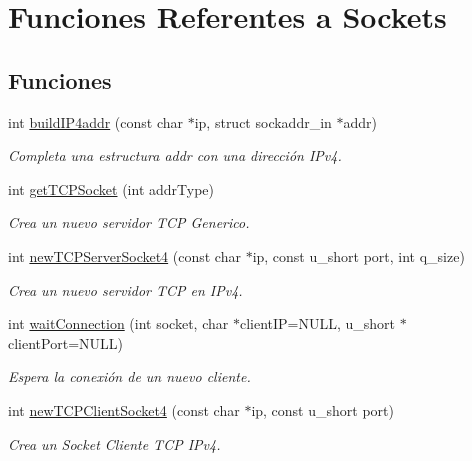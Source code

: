 \hypertarget{group__sockets}{
\section{Funciones Referentes a Sockets}
\label{group__sockets}
}
\subsection*{Funciones}
\begin{DoxyCompactItemize}
\item 
int \hyperlink{group__sockets_gadd88367e2f2c1ed8f81e910250a06180}{buildIP4addr} (const char $\ast$ip, struct sockaddr\_\-in $\ast$addr)
\begin{DoxyCompactList}\small\item\em Completa una estructura addr con una dirección IPv4. \end{DoxyCompactList}\item 
int \hyperlink{group__sockets_ga88bd320eafca5b9f4c54c4b5f3a17925}{getTCPSocket} (int addrType)
\begin{DoxyCompactList}\small\item\em Crea un nuevo servidor TCP Generico. \end{DoxyCompactList}\item 
int \hyperlink{group__sockets_ga944d699e112e8607aaa4a070d86d6e65}{newTCPServerSocket4} (const char $\ast$ip, const u\_\-short port, int q\_\-size)
\begin{DoxyCompactList}\small\item\em Crea un nuevo servidor TCP en IPv4. \end{DoxyCompactList}\item 
int \hyperlink{group__sockets_gac7d9d9b68342787f3d6ef71e91459e35}{waitConnection} (int socket, char $\ast$clientIP=NULL, u\_\-short $\ast$clientPort=NULL)
\begin{DoxyCompactList}\small\item\em Espera la conexión de un nuevo cliente. \end{DoxyCompactList}\item 
int \hyperlink{group__sockets_ga2d8f76b55a8d6bdefb097ff1554efa54}{newTCPClientSocket4} (const char $\ast$ip, const u\_\-short port)
\begin{DoxyCompactList}\small\item\em Crea un Socket Cliente TCP IPv4. \end{DoxyCompactList}\end{DoxyCompactItemize}


